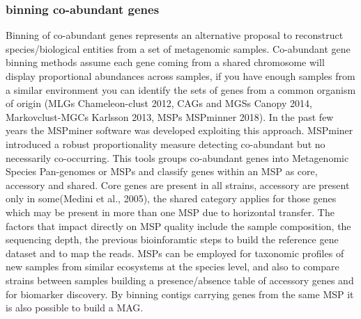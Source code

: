\documentclass{article}
\begin{document}
\subsubsection{ binning co-abundant genes}
Binning of co-abundant genes represents an alternative proposal to reconstruct species/biological entities from a set of metagenomic samples.
Co-abundant gene binning methods assume each gene coming from a shared chromosome will display proportional abundances across samples, if you have enough samples from a similar environment you can identify the sets of genes from a common organism of origin (MLGs Chameleon-clust 2012, CAGs and MGSs Canopy 2014, Markovclust-MGCs Karlsson 2013, MSPs MSPminner 2018).
In the past few years the MSPminer software was developed exploiting this approach. MSPminer introduced a robust proportionality measure detecting co-abundant but no necessarily co-occurring.
This tools groups co-abundant genes into Metagenomic Species Pan-genomes or \glspl{MSP} and classify genes within an MSP as core, accessory and shared. Core genes are present in all strains, accessory are present only in some(Medini et al., 2005), the shared category applies for those genes which may be present in more than one MSP due to horizontal transfer.
The factors that impact directly on \gls{MSP} quality include the sample composition, the sequencing depth, the previous bioinforamtic steps to build the reference gene dataset and to map the reads.
MSPs can be employed for taxonomic profiles of new samples from similar ecosystems at the species level, and also to compare strains between samples building a presence/absence table of accessory genes and for biomarker discovery.
By binning contigs carrying genes from the same MSP it is also possible to build a \gls{MAG}.

\end{document}
